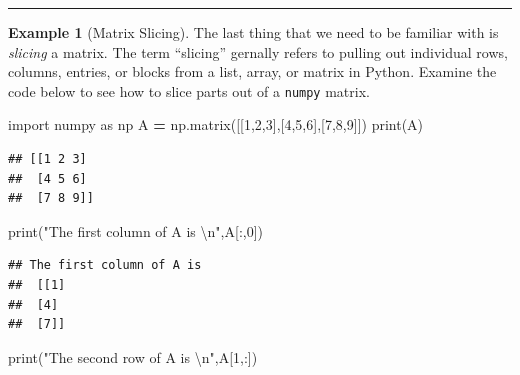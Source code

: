 \documentclass[
]{book}
\newenvironment{Shaded}{\begin{snugshade}}{\end{snugshade}}
\newcommand{\BuiltInTok}[1]{#1}
\newcommand{\CharTok}[1]{\textcolor[rgb]{0.31,0.60,0.02}{#1}}
\newcommand{\DecValTok}[1]{\textcolor[rgb]{0.00,0.00,0.81}{#1}}
\newcommand{\ImportTok}[1]{#1}
\newcommand{\NormalTok}[1]{#1}
\newcommand{\OperatorTok}[1]{\textcolor[rgb]{0.81,0.36,0.00}{\textbf{#1}}}
\newcommand{\StringTok}[1]{\textcolor[rgb]{0.31,0.60,0.02}{#1}}
\theoremstyle{definition}
\theoremstyle{definition}
\newtheorem{example}{Example}[chapter]
\theoremstyle{definition}
\theoremstyle{remark}
\begin{document}
\begin{center}\rule{0.5\linewidth}{0.5pt}\end{center}

\begin{example}[Matrix Slicing]
\protect\hypertarget{exm:unnamed-chunk-285}{}{\label{exm:unnamed-chunk-285} {} }The last thing that we need to be familiar with is \emph{slicing} a matrix. The term ``slicing'' gernally refers to pulling out individual rows, columns, entries, or blocks from a list, array, or matrix in Python. Examine the code below to see how to slice parts out of a \texttt{numpy} matrix.
\end{example}

\begin{Shaded}
\begin{Highlighting}[]
\ImportTok{import}\NormalTok{ numpy }\ImportTok{as}\NormalTok{ np}
\NormalTok{A }\OperatorTok{=}\NormalTok{ np.matrix([[}\DecValTok{1}\NormalTok{,}\DecValTok{2}\NormalTok{,}\DecValTok{3}\NormalTok{],[}\DecValTok{4}\NormalTok{,}\DecValTok{5}\NormalTok{,}\DecValTok{6}\NormalTok{],[}\DecValTok{7}\NormalTok{,}\DecValTok{8}\NormalTok{,}\DecValTok{9}\NormalTok{]])}
\BuiltInTok{print}\NormalTok{(A)}
\end{Highlighting}
\end{Shaded}

\begin{verbatim}
## [[1 2 3]
##  [4 5 6]
##  [7 8 9]]
\end{verbatim}

\begin{Shaded}
\begin{Highlighting}[]
\BuiltInTok{print}\NormalTok{(}\StringTok{"The first column of A is }\CharTok{\textbackslash{}n}\StringTok{"}\NormalTok{,A[:,}\DecValTok{0}\NormalTok{])}
\end{Highlighting}
\end{Shaded}

\begin{verbatim}
## The first column of A is 
##  [[1]
##  [4]
##  [7]]
\end{verbatim}

\begin{Shaded}
\begin{Highlighting}[]
\BuiltInTok{print}\NormalTok{(}\StringTok{"The second row of A is }\CharTok{\textbackslash{}n}\StringTok{"}\NormalTok{,A[}\DecValTok{1}\NormalTok{,:])}
\end{Highlighting}
\end{Shaded}
\end{document}
